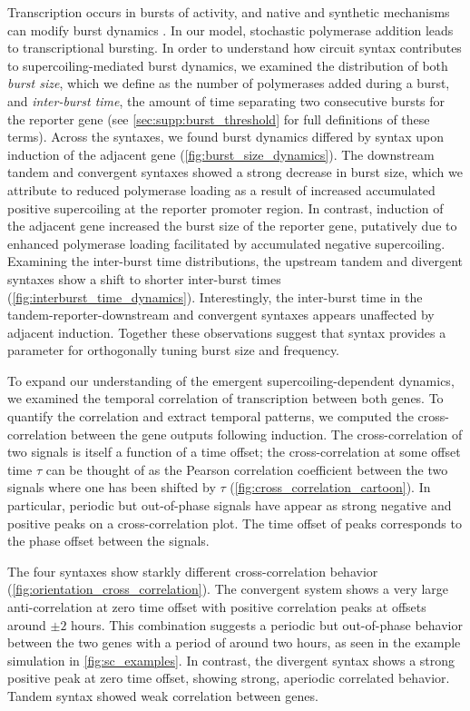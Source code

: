\documentclass[11pt]{article}
\begin{document}
Transcription occurs in bursts of activity, and native and synthetic mechanisms can modify burst dynamics \parencite{desaiDNArepairPathwayCan2021,chongMechanismTranscriptionalBursting2014,poppAlteringTranscriptionFactor2021}.
In our model, stochastic polymerase addition leads to transcriptional bursting. In order to understand how circuit syntax contributes to supercoiling-mediated burst dynamics, we examined the distribution of both \emph{burst size}, which we define as the number of polymerases added during a burst, and \emph{inter-burst time}, the amount of time separating two consecutive bursts for the reporter gene (see \cref{sec:supp:burst_threshold} for full definitions of these terms). Across the syntaxes, we found burst dynamics differed by syntax upon induction of the adjacent gene (\cref{fig:burst_size_dynamics}). The downstream tandem and convergent syntaxes showed a strong decrease in burst size, which we attribute to reduced polymerase loading as a result of increased accumulated positive supercoiling at the reporter promoter region. In contrast, induction of the adjacent gene increased the burst size of the reporter gene, putatively due to enhanced polymerase loading facilitated by accumulated negative supercoiling. Examining the inter-burst time distributions, the upstream tandem and divergent syntaxes show a shift to shorter inter-burst times (\cref{fig:interburst_time_dynamics}). Interestingly, the inter-burst time in the tandem-reporter-downstream and convergent syntaxes appears unaffected by adjacent induction. Together these observations suggest that syntax provides a parameter for orthogonally tuning burst size and frequency.

To expand our understanding of the emergent supercoiling-dependent dynamics, we examined the temporal correlation of transcription between both genes. To quantify the correlation and extract temporal patterns, we computed the cross-correlation between the gene outputs following induction. The cross-correlation of two signals is itself a function of a time offset; the cross-correlation at some offset time \(\tau\) can be thought of as the Pearson correlation coefficient between the two signals where one has been shifted by \(\tau\) (\cref{fig:cross_correlation_cartoon}). In particular, periodic but out-of-phase signals have appear as strong negative and positive peaks on a cross-correlation plot.  The time offset of peaks corresponds to the phase offset between the signals.

The four syntaxes show starkly different cross-correlation behavior (\cref{fig:orientation_cross_correlation}).  The convergent system shows a very large anti-correlation at zero time offset with positive correlation peaks at offsets around \(\pm 2\) hours. This combination suggests a periodic but out-of-phase behavior between the two genes with a period of around two hours, as seen in the example simulation in \cref{fig:sc_examples}. In contrast, the divergent syntax shows a strong positive peak at zero time offset, showing strong, aperiodic correlated behavior. Tandem syntax showed weak correlation between genes. 
\end{document}
